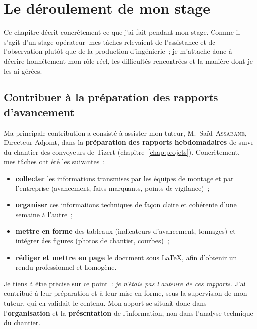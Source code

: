 \chapter{Le déroulement de mon stage}
\label{chap:stage}

Ce chapitre décrit concrètement ce que j'ai fait pendant mon stage. Comme il s'agit d'un stage opérateur, mes tâches relevaient de l'assistance et de l'observation plutôt que de la production d'ingénierie~; je m'attache donc à décrire honnêtement mon rôle réel, les difficultés rencontrées et la manière dont je les ai gérées.

\section{Contribuer à la préparation des rapports d'avancement}

Ma principale contribution a consisté à assister mon tuteur, M.~Saïd~\textsc{Assabane}, Directeur Adjoint, dans la \textbf{préparation des rapports hebdomadaires} de suivi du chantier des convoyeurs de Tizert (chapitre~\ref{chap:projets}). Concrètement, mes tâches ont été les suivantes~:

\begin{itemize}
\item \textbf{collecter} les informations transmises par les équipes de montage et par l'entreprise (avancement, faits marquants, points de vigilance)~;
\item \textbf{organiser} ces informations techniques de façon claire et cohérente d'une semaine à l'autre~;
\item \textbf{mettre en forme} des tableaux (indicateurs d'avancement, tonnages) et intégrer des figures (photos de chantier, courbes)~;
\item \textbf{rédiger et mettre en page} le document sous \LaTeX, afin d'obtenir un rendu professionnel et homogène.
\end{itemize}

Je tiens à être précise sur ce point~: \emph{je n'étais pas l'auteure de ces rapports}. J'ai contribué à leur préparation et à leur mise en forme, sous la supervision de mon tuteur, qui en validait le contenu. Mon apport se situait donc dans l'\textbf{organisation} et la \textbf{présentation} de l'information, non dans l'analyse technique du chantier.

